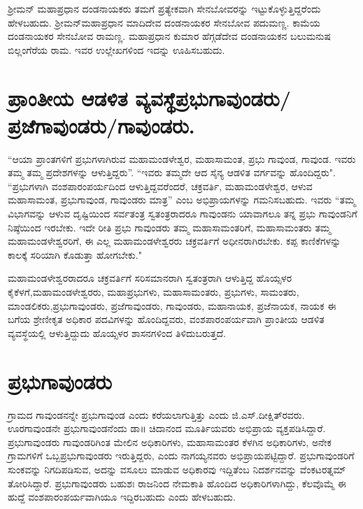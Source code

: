 ಶ‍್ರೀಮನ್​ ಮಹಾಪ್ರಧಾನ ದಂಡನಾಯಕರು ತಮಗೆ ಪ್ರತ್ಯೇಕವಾಗಿ ಸೇನಬೋವರನ್ನು ಇಟ್ಟುಕೊಳ್ಳುತ್ತಿದ್ದರೆಂದು ಹೇಳ\-ಬಹುದು. ಶ‍್ರೀಮನ್​ಮಹಾಪ್ರಧಾನ ಮಾದಿದೇವ ದಂಡನಾಯಕರ ಸೇನಬೋವ ಪದುಮಣ್ಣ. ಕಾಮೆಯ ದಂಡನಾಯಕರ ಸೇನಬೋವ ರಾಮಣ್ಣ. ಮಹಾಪ್ರಧಾನ ಕುಮಾರ ಹೆಗ್ಗಡೆದೇವ ದಂಡನಾಯಕನ ಬಲುಮನುಷ ಬಿಲ್ಲಂಗೆರೆಯ ರಾಮ. ಇವರ ಉಲ್ಲೇಖಗಳಿಂದ ಇದನ್ನು ಊಹಿಸಬಹುದು.


\section{ಪ್ರಾಂತೀಯ ಆಡಳಿತ ವ್ಯವಸ್ಥೆ\enginline{--}ಪ್ರಭುಗಾವುಂಡರು/ಪ್ರಜೆಗಾವುಂಡರು/ಗಾವುಂಡರು.}

“ಆಯಾ ಪ್ರಾಂತಗಳಿಗೆ ಪ್ರಭುಗಳಾಗಿರುವ ಮಹಾಮಂಡಳೇಶ್ವರ, ಮಹಾಸಾಮಂತ, ಪ್ರಭು ಗಾವುಂಡ, ಗಾವುಂಡ. ಇವರು ತಮ್ಮ ತಮ್ಮ ಪ್ರದೇಶಗಳನ್ನು ಆಳುತ್ತಿದ್ದರು”. “ಇವರು ತಮ್ಮದೇ ಆದ ಸೈನ್ಯ ಆಡಳಿತ ವರ್ಗವನ್ನು ಹೊಂದಿದ್ದರು". “ಪ್ರಭುಗಳಾಗಿ ವಂಶಪಾರಂಪರ್ಯದಿಂದ ಆಳುತ್ತಿದ್ದವರೆಂದರೆ, ಚಕ್ರವರ್ತಿ, ಮಹಾಮಂಡಳೇಶ್ವರ, ಆಳುವ ಮಹಾಸಾಮಂತ, ಪ್ರಭುಗಾವುಂಡ, ಗಾವುಂಡರು ಮಾತ್ರ” ಎಂಬ ಅಭಿಪ್ರಾಯಗಳನ್ನು ಗಮನಿಸಬಹುದು. ಇವರು “ತಮ್ಮ ವಿಭಾಗವನ್ನು ಆಳುವ ದೃಷ್ಟಿಯಿಂದ ಸರ್ವತಂತ್ರ ಸ್ವತಂತ್ರರಾದರೂ ಗಾವುಂಡನು ಯಾವಾಗಲೂ ತನ್ನ ಪ್ರಭು ಗಾವುಂಡನಿಗೆ ನಿಷ್ಠೆಯಿಂದ ಇರಬೇಕು. ಇದೇ ರೀತಿ ಪ್ರಭು ಗಾವುಂಡರು ತಮ್ಮ ಮಹಾಸಾಮಂತರಿಗೆ, ಮಹಾಸಾಮಂತರು ತಮ್ಮ ಮಹಾಮಂಡಳೇಶ್ವರ\-ರಿಗೆ, ಈ ಎಲ್ಲ ಮಹಾಮಂಡಳೇಶ್ವರರು ಚಕ್ರವರ್ತಿಗೆ ಅಧೀನರಾಗಿರಬೇಕು. ಕಪ್ಪ ಕಾಣಿಕೆಗಳನ್ನು ಕಾಲಕ್ಕೆ ಸರಿಯಾಗಿ ಕೊಡುತ್ತಾ ಹೋಗಬೇಕು."

ಮಹಾಮಂಡಳೇಶ್ವರರಾದರೂ ಚಕ್ರವರ್ತಿಗೆ ಸರಿಸಮಾನರಾಗಿ ಸ್ವತಂತ್ರರಾಗಿ ಆಳುತ್ತಿದ್ದ ಹೊಯ್ಸಳರ ಕೈಕೆಳಗೆ,\break ಮಹಾಮಂಡಳೇಶ್ವರರು, ಮಹಾಪ್ರಭುಗಳು, ಮಹಾಸಾಮಂತರು, ಪ್ರಭುಗಳು, ಸಾಮಂತರು, ಮಾಂಡಲಿಕರು,\break ಪ್ರಭುಗಾವುಂಡರು, ಪ್ರಜೆಗಾವುಂಡರು, ಗಾವುಂಡರು, ಮಹಾನಾಯಕ, ಪ್ರಜೆನಾಯಕ, ನಾಯಕ ಈ ಬಗೆಯ ಶ್ರೇಣೀಕೃತ ಅಧಿಕಾರ ಪದವಿಗಳನ್ನು ಹೊಂದಿದ್ದವರು, ವಂಶಪಾರಂಪರ್ಯವಾಗಿ ಪ್ರಾಂತೀಯ ಆಡಳಿತ ವ್ಯವಸ್ಥೆಯಲ್ಲಿ ಆಳುತ್ತಿದ್ದುದು ಹೊಯ್ಸಳರ ಶಾಸನಗಳಿಂದ ತಿಳಿದುಬರುತ್ತದೆ.


\section{ಪ್ರಭುಗಾವುಂಡರು}

ಗ್ರಾಮದ ಗಾವುಂಡನನ್ನೇ ಪ್ರಭುಗಾವುಂಡ ಎಂದು ಕರೆಯಲಾಗುತ್ತಿತ್ತು ಎಂದು ಜಿ.ಎಸ್​.ದೀಕ್ಷಿತ್​ರವರು. ಊರಗಾವುಂಡನೇ ಪ್ರಭುಗಾವುಂಡನೆಂದು ಡಾ॥ ಚಿದಾನಂದ ಮೂರ್ತಿಯವರು ಅಭಿಪ್ರಾಯ ವ್ಯಕ್ತಪಡಿಸಿದ್ದಾರೆ. ಪ್ರಭುಗಾವುಂಡರು ಗಾವುಂಡರಿಗಿಂತ ಮೇಲಿನ ಅಧಿಕಾರಿಗಳು, ಮಹಾಸಾಮಂತರ ಕೆಳಗಿನ ಅಧಿಕಾರಿಗಳು, ಅನೇಕ ಗ್ರಾಮಗಳಿಗೆ ಒಬ್ಬ\break ಪ್ರಭುಗಾವುಂಡರು ಇರುತ್ತಿದ್ದರು, ಎಂದು ನಾಗಯ್ಯನವರು ಅಭಿಪ್ರಾಯಪಟ್ಟಿದ್ದಾರೆ. ಪ್ರಭುಗಾವುಂಡರಿಗೆ ಸುಂಕವನ್ನು ನಿಗದಿಪಡಿಸುವ, ಅದನ್ನು ವಸೂಲು ಮಾಡುವ ಅಧಿಕಾರವು ಇದ್ದಿತೆಂಬ ನಿದರ್ಶನವನ್ನು ವೆಂಕಟರತ್ನಮ್ ತೋರಿಸಿದ್ದಾರೆ. ಪ್ರಭುಗಾವುಂಡರು ಬಹುಶಃ ರಾಜನಿಂದ ನೇಮಕಾತಿ ಹೊಂದಿದ ಅಧಿಕಾರಿಗಳಾಗಿದ್ದು, ಕೆಲವೊಮ್ಮೆ ಈ ಹುದ್ದೆ ವಂಶಪಾರಂಪರ್ಯ\-ವಾಗಿಯೂ ಇದ್ದಿರಬಹುದು ಎಂದು ಹೇಳಬಹುದು.

